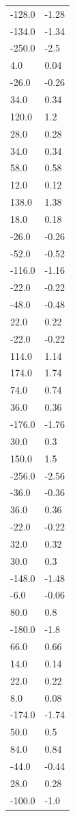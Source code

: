 \begin{longtable}{ll}
-128.0 & -1.28 \\
-134.0 & -1.34 \\
-250.0 & -2.5 \\
4.0 & 0.04 \\
-26.0 & -0.26 \\
34.0 & 0.34 \\
120.0 & 1.2 \\
28.0 & 0.28 \\
34.0 & 0.34 \\
58.0 & 0.58 \\
12.0 & 0.12 \\
138.0 & 1.38 \\
18.0 & 0.18 \\
-26.0 & -0.26 \\
-52.0 & -0.52 \\
-116.0 & -1.16 \\
-22.0 & -0.22 \\
-48.0 & -0.48 \\
22.0 & 0.22 \\
-22.0 & -0.22 \\
114.0 & 1.14 \\
174.0 & 1.74 \\
74.0 & 0.74 \\
36.0 & 0.36 \\
-176.0 & -1.76 \\
30.0 & 0.3 \\
150.0 & 1.5 \\
-256.0 & -2.56 \\
-36.0 & -0.36 \\
36.0 & 0.36 \\
-22.0 & -0.22 \\
32.0 & 0.32 \\
30.0 & 0.3 \\
-148.0 & -1.48 \\
-6.0 & -0.06 \\
80.0 & 0.8 \\
-180.0 & -1.8 \\
66.0 & 0.66 \\
14.0 & 0.14 \\
22.0 & 0.22 \\
8.0 & 0.08 \\
-174.0 & -1.74 \\
50.0 & 0.5 \\
84.0 & 0.84 \\
-44.0 & -0.44 \\
28.0 & 0.28 \\
-100.0 & -1.0 \\

\end{longtable}
